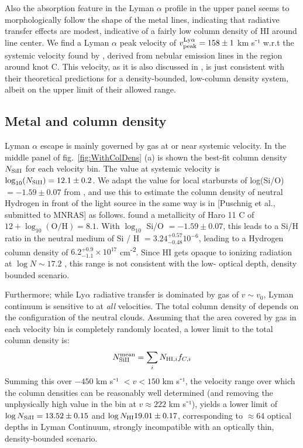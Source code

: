 \documentclass[twocolumn]{aastex61}
\begin{document}
Also the absorption feature in the Lyman $\alpha$ profile in the upper
panel seems to morphologically follow the shape of the metal lines,
indicating that radiative transfer effects are modest, indicative of a
fairly low column density of HI around line center. We find a Lyman
$\alpha$ peak velocity of $v_{\rm peak}^{\mathrm{Ly}\alpha} = 158 \pm 1$
km s⁻¹ w.r.t the systemic velocity found by \citet{Sandberg2013},
derived from nebular emission lines in the region around knot C. This
velocity, as it is also discussed in \citet{Verhamme2015}, is just
consistent with their theoretical predictions for a density-bounded,
low-column density system, albeit on the upper limit of their allowed
range.

\subsection{Metal and  column
density}\label{metal-and-column-density}

Lyman $\alpha$ escape is mainly governed by gas at or near systemic
velocity. In the middle panel of fig.~\ref{fig:WithColDens} (a) is shown
the best-fit column density $N_{\rm Si II}$ for each velocity bin. The
value at systemic velocity is $\log_{10}(N_{\rm Si II}) = 12.1 \pm 0.2$.
We adapt the value for local starbursts of log(Si/O) $= -1.59 \pm 0.07$
from \citet{Garnett1995}, and use this to estimate the column density of
neutral Hydrogen in front of the light source in the same way is in
{[}Puschnig et al., submitted to MNRAS{]} as follows. \citet{Guseva2012}
found a metallicity of Haro 11 C of $12 + \log_{10}(\text{O/H}) = 8.1$.
With $\log_{10}$ Si/O $= -1.59 \pm 0.07$, this leads to a Si/H ratio in
the neutral medium of Si / H $= 3.24^{+0.57}_{-0.48} 10^{-6}$, leading
to a Hydrogen column density of $6.2^{+0.9}_{-1.1} \times 10^{17}$
cm\textsuperscript{-2}. Since HI gets opaque to ionizing radiation at
$\log N \sim 17.2$ \citep{Verhamme2015}, this range is not consistent
with the low- optical depth, density bounded scenario.

Furthermore; while Ly$\alpha$ radiative transfer is dominated by gas of
$v \sim v_0$, Lyman continuum is sensitive to  at \emph{all}
velocities. The total column density of  depends on the
configuration of the neutral clouds. Assuming that the area covered by
gas in each velocity bin is completely randomly located, a lower limit
to the total column density is:
%
\begin{equation}
\label{NHImean}
N_{\rm Si II}^{\rm mean} = \sum_i N_{\text{HI}, i} f_{C, i}
\end{equation}
%
 Summing this over $-450$ km s⁻¹ $< v < 150$ km s⁻¹, the velocity range
over which the column densities can be reasonably well determined (and
removing the unphysically high value in the bin at $v \approx 222$ km
s⁻¹), yields a lower limit of $\log N_{\rm Si II} = 13.52 \pm 0.15$ and
$\log N_{\rm H I} 19.01 \pm 0.17$, corresponding to $\approx 64$ optical
depths in Lyman Continuum, strongly incompatible with an optically thin,
density-bounded scenario.
\end{document}
